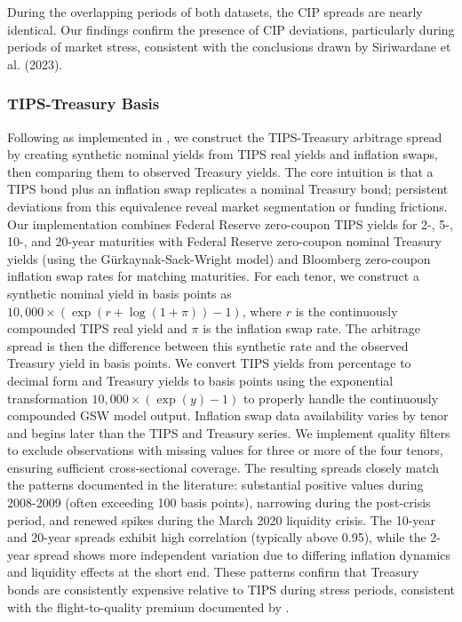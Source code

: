 \documentclass{article}
\begin{document}
\begin{appendices}
\FloatBarrier


During the overlapping periods of both datasets, the CIP spreads are nearly identical.
Our findings confirm the presence of CIP deviations, particularly during periods of
market stress, consistent with the conclusions drawn by Siriwardane et al. (2023).

\subsubsection{TIPS-Treasury Basis}

Following \citet{Fleckenstein2014} as implemented in \citet{Siriwardane2021}, we construct the TIPS-Treasury arbitrage spread by creating synthetic nominal yields from TIPS real yields and inflation swaps, then comparing them to observed Treasury yields. The core intuition is that a TIPS bond plus an inflation swap replicates a nominal Treasury bond; persistent deviations from this equivalence reveal market segmentation or funding frictions. Our implementation combines Federal Reserve zero-coupon TIPS yields for 2-, 5-, 10-, and 20-year maturities with Federal Reserve zero-coupon nominal Treasury yields (using the Gürkaynak-Sack-Wright model) and Bloomberg zero-coupon inflation swap rates for matching maturities. For each tenor, we construct a synthetic nominal yield in basis points as $10{,}000 \times (\exp(r + \log(1 + \pi)) - 1)$, where $r$ is the continuously compounded TIPS real yield and $\pi$ is the inflation swap rate. The arbitrage spread is then the difference between this synthetic rate and the observed Treasury yield in basis points. We convert TIPS yields from percentage to decimal form and Treasury yields to basis points using the exponential transformation $10{,}000 \times (\exp(y) - 1)$ to properly handle the continuously compounded GSW model output. Inflation swap data availability varies by tenor and begins later than the TIPS and Treasury series. We implement quality filters to exclude observations with missing values for three or more of the four tenors, ensuring sufficient cross-sectional coverage. The resulting spreads closely match the patterns documented in the literature: substantial positive values during 2008-2009 (often exceeding 100 basis points), narrowing during the post-crisis period, and renewed spikes during the March 2020 liquidity crisis. The 10-year and 20-year spreads exhibit high correlation (typically above 0.95), while the 2-year spread shows more independent variation due to differing inflation dynamics and liquidity effects at the short end. These patterns confirm that Treasury bonds are consistently expensive relative to TIPS during stress periods, consistent with the flight-to-quality premium documented by \citet{Fleckenstein2014}.


\end{appendices}
\end{document}

